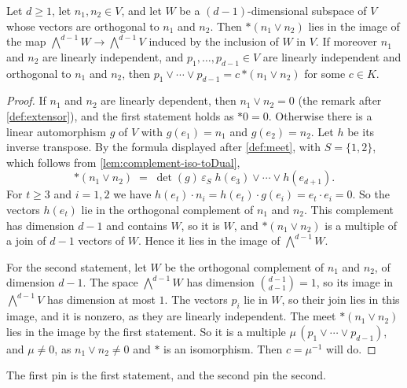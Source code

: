 \begin{lemma}
  \label{lem:meet-two-hyperplanes}
  \leanok
  Let $d \ge 1$, let $n_1, n_2 \in V$, and let $W$ be a
  $(d-1)$-dimensional subspace of $V$ whose vectors are orthogonal to
  $n_1$ and $n_2$. Then $*(n_1 \vee n_2)$ lies in the image of the map
  $\bigwedge^{d-1} W \to \bigwedge^{d-1} V$ induced by the inclusion of
  $W$ in $V$. If moreover $n_1$ and $n_2$ are linearly independent, and
  $p_1, \dots, p_{d-1} \in V$ are linearly independent and orthogonal to
  $n_1$ and $n_2$, then
  $p_1 \vee \cdots \vee p_{d-1} = c\, {*(n_1 \vee n_2)}$ for some
  $c \in K$.
\end{lemma}
\begin{proof}
  \leanok
  If $n_1$ and $n_2$ are linearly dependent, then $n_1 \vee n_2 = 0$
  (the remark after \cref{def:extensor}), and the first statement holds
  as $*0 = 0$. Otherwise there is a linear automorphism $g$ of $V$ with
  $g(e_1) = n_1$ and $g(e_2) = n_2$. Let $h$ be its inverse transpose.
  By the formula displayed after \cref{def:meet}, with $S = \{1, 2\}$,
  which follows from \cref{lem:complement-iso-toDual},
  \[
    *(n_1 \vee n_2) \;=\; \det(g)\, \varepsilon_S\;
    h(e_3) \vee \cdots \vee h(e_{d+1}).
  \]
  For $t \ge 3$ and $i = 1, 2$ we have
  $h(e_t) \cdot n_i = h(e_t) \cdot g(e_i) = e_t \cdot e_i = 0$. So the
  vectors $h(e_t)$ lie in the orthogonal complement of $n_1$ and $n_2$.
  This complement has dimension $d - 1$ and contains $W$, so it is $W$,
  and $*(n_1 \vee n_2)$ is a multiple of a join of $d - 1$ vectors of
  $W$. Hence it lies in the image of $\bigwedge^{d-1} W$.

  For the second statement, let $W$ be the orthogonal complement of
  $n_1$ and $n_2$, of dimension $d - 1$. The space $\bigwedge^{d-1} W$
  has dimension $\binom{d-1}{d-1} = 1$, so its image in
  $\bigwedge^{d-1} V$ has dimension at most $1$. The vectors $p_i$ lie in
  $W$, so their join lies in this image, and it is nonzero, as they are
  linearly independent. The meet $*(n_1 \vee n_2)$ lies in the image by
  the first statement. So it is a multiple $\mu\, (p_1 \vee \cdots \vee
  p_{d-1})$, and $\mu \neq 0$, as $n_1 \vee n_2 \neq 0$ and $*$ is an
  isomorphism. Then $c = \mu^{-1}$ will do.
\end{proof}
\begin{fmlnote}
  The first pin is the first statement, and the second pin the second.
\end{fmlnote}

